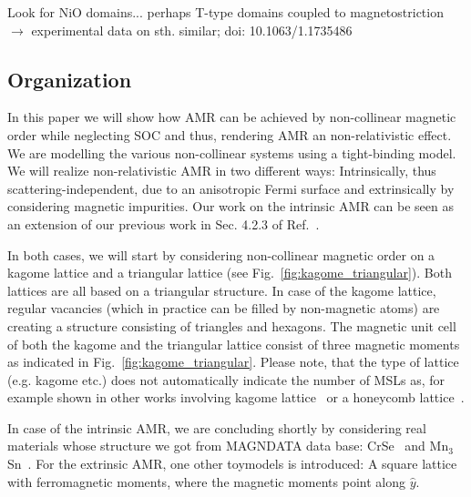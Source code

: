 \documentclass[prb,showpacs,amsmath,amssymb,superscriptaddress,twocolumn,floatfix]{revtex4-1}
\begin{document}
{\color{red} Look for NiO domains... perhaps T-type domains coupled to magnetostriction $\rightarrow$ experimental data on sth. similar; doi: 10.1063/1.1735486}

\subsection{Organization}

In this paper we will show how AMR can be achieved by non-collinear magnetic order while neglecting SOC and thus, rendering AMR an non-relativistic effect. We are modelling the various non-collinear systems using a tight-binding model. We will realize non-relativistic AMR in two different ways: Intrinsically, thus scattering-independent, due to an anisotropic Fermi surface and extrinsically by considering magnetic impurities. Our work on the intrinsic AMR can be seen as an extension of our previous work in Sec. 4.2.3 of Ref.~\cite{Ritzinger:2023}.

In both cases, we will start by considering non-collinear magnetic order on a kagome lattice and a triangular lattice (see Fig.~\ref{fig:kagome_triangular}). Both lattices are all based on a triangular structure. In case of the kagome lattice, regular vacancies (which in practice can be filled by non-magnetic atoms) are creating a structure consisting of triangles and hexagons. The magnetic unit cell of both the kagome and the triangular lattice consist of three magnetic moments as indicated in Fig.~\ref{fig:kagome_triangular}. Please note, that the type of lattice (e.g. kagome etc.) does not automatically indicate the number of MSLs as, for example shown in other works involving kagome lattice~\cite{Hayami:2020} or a honeycomb lattice~\cite{Rusnacko:2019}.

In case of the intrinsic AMR, we are concluding shortly by considering real materials whose structure we got from MAGNDATA data base: CrSe~\cite{Magndata:CrSe} and Mn$_3$Sn~\cite{Magndata:Mn3Sn}. For the extrinsic AMR, one other toymodels is introduced: A square lattice with ferromagnetic moments, where the magnetic moments point along $\hat{y}$.
\end{document}
